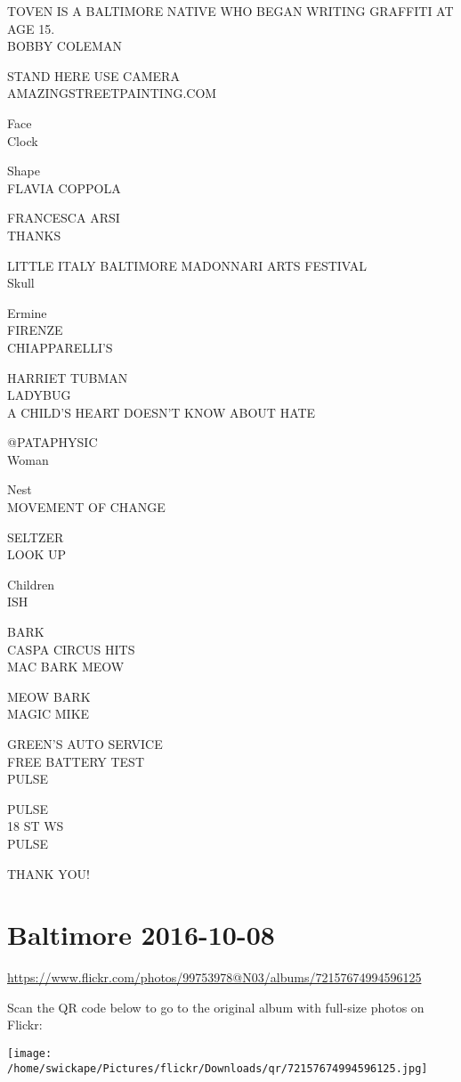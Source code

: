 \documentclass[10pt,letterpaper]{article}
\begin{document}
TOVEN IS A BALTIMORE NATIVE WHO BEGAN WRITING GRAFFITI AT AGE 15.\\
BOBBY COLEMAN

STAND HERE USE CAMERA\\
AMAZINGSTREETPAINTING.COM

Face\\
Clock

Shape\\
FLAVIA COPPOLA

FRANCESCA ARSI\\
THANKS

LITTLE ITALY BALTIMORE MADONNARI ARTS FESTIVAL\\
Skull

Ermine\\
FIRENZE\\
CHIAPPARELLI'S

HARRIET TUBMAN\\
LADYBUG\\
A CHILD'S HEART DOESN'T KNOW ABOUT HATE

@PATAPHYSIC\\
Woman

Nest\\
MOVEMENT OF CHANGE

SELTZER\\
LOOK UP

Children\\
ISH

BARK\\
CASPA CIRCUS HITS\\
MAC BARK MEOW

MEOW BARK\\
MAGIC MIKE

GREEN'S AUTO SERVICE\\
FREE BATTERY TEST\\
PULSE

PULSE\\
18 ST WS\\
PULSE

THANK YOU!


\section*{Baltimore 2016-10-08}

\url{https://www.flickr.com/photos/99753978@N03/albums/72157674994596125}

Scan the QR code below to go to the original album with full-size photos on Flickr:

\texttt{[image: /home/swickape/Pictures/flickr/Downloads/qr/72157674994596125.jpg]}
\end{document}
